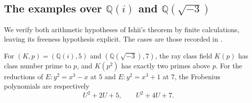 







\subsection{The examples over \(\mathbb Q(i)\) and
\(\mathbb Q(\sqrt{-3})\)}

We verify both arithmetic hypotheses of Ishii's theorem by
finite calculations, leaving its freeness hypothesis explicit.
The cases are those recorded in
\cite[Example 1.2, p.~3]{Ishii}.

\begin{proposition}\label{prop:cm-small-primes}
For \((K,p)=(\mathbb Q(i),5)\) and
\((\mathbb Q(\sqrt{-3}),7)\), the ray class field \(K(p)\) has
class number prime to \(p\), and \(K(p^2)\) has exactly two primes
above \(p\). For the reductions of
\(E:y^2=x^3-x\) at \(5\) and \(E:y^2=x^3+1\) at \(7\),
the Frobenius polynomials are respectively
\[
 U^2+2U+5,\qquad U^2+4U+7 .
\]
\end{proposition}
